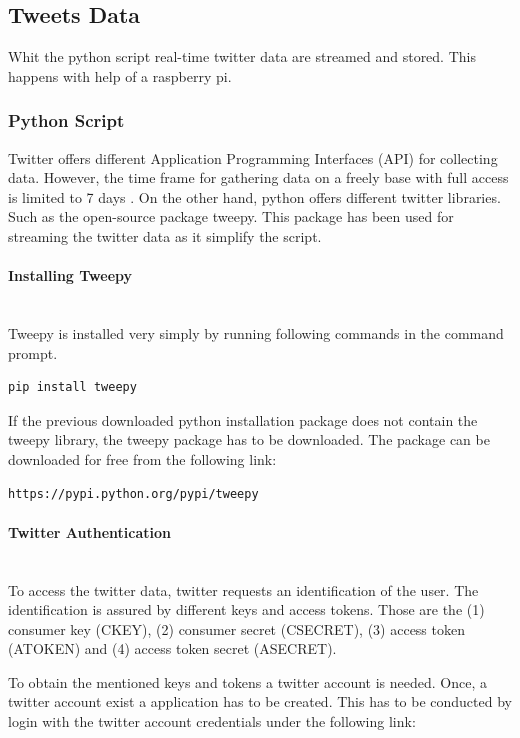 \documentclass[a4paper,12pt]{article}
\begin{document}
\begin{spacing}{1.2}
\subsection{Tweets Data}
Whit the python script real-time twitter data are streamed and stored. This happens with help of a raspberry pi.
\subsubsection{Python Script}
Twitter offers different Application Programming Interfaces (API) for collecting data. However, the time frame for gathering data on a freely base with full access is limited to 7 days \parencite{twitterinc2017a}. On the other hand, python offers different twitter libraries. Such as the open-source package tweepy. This package has been used for streaming the twitter data as it simplify the script.

\paragraph{Installing Tweepy}\mbox{}\\{}
Tweepy is installed very simply by running following commands in the command prompt. 
\begin{lstlisting}[language=bash]
pip install tweepy
\end{lstlisting}

If the previous downloaded python installation package does not contain the tweepy library, the tweepy package has to be downloaded. The package can be downloaded for free from the following link:
\begin{lstlisting}[language=bash]
https://pypi.python.org/pypi/tweepy
\end{lstlisting}

\paragraph{Twitter Authentication}\mbox{}\\{}
To access the twitter data, twitter requests an identification of the user. The identification is assured by different keys and access tokens. Those are the (1) consumer key (CKEY), (2) consumer secret (CSECRET), (3) access token (ATOKEN) and (4) access token secret (ASECRET). \parencite{twitterinc2017b}

To obtain the mentioned keys and tokens a twitter account is needed. Once, a twitter account exist a application has to be created. This has to be conducted by login with the twitter account credentials under the following link: 
\begin{lstlisting}[language=bash]
%https://apps.twitter.com/
\end{lstlisting}


\end{spacing}
\end{document}
